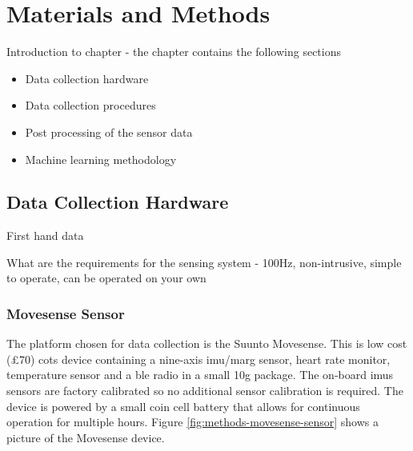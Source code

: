 \chapter{Materials and Methods}
\label{chp:methods}

Introduction to chapter - the chapter contains the following sections
\begin{itemize}
    \item Data collection hardware
    \item Data collection procedures
    \item Post processing of the sensor data
    \item Machine learning methodology
\end{itemize}


\section{Data Collection Hardware}
First hand data

What are the requirements for the sensing system - 100Hz, non-intrusive, simple to operate, can be operated on your own



\subsection{Movesense Sensor}
The platform chosen for data collection is the Suunto Movesense. This is low cost (£70) \acrfull{cots} device containing a nine-axis \acrshort{imu}/\acrshort{marg} sensor, heart rate monitor, temperature sensor and a \acrfull{ble} radio in a small 10g package. The on-board \acrshort{imu}s sensors are factory calibrated so no additional sensor calibration is required. The device is powered by a small coin cell battery that allows for continuous operation for multiple hours. Figure \ref{fig:methods-movesense-sensor} shows a picture of the Movesense device.

